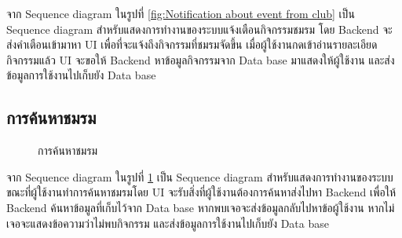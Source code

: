 \documentclass[14pt,oneside,openright,a4paper]{cpe-thai-project}
\begin{document}
  จาก Sequence diagram ในรูปที่ \ref{fig:Notification about event from club} เป็น Sequence diagram สำหรับแสดงการทำงานของระบบแจ้งเตือนกิจกรรมชมรม โดย Backend จะส่งคำเตือนเข้ามาหา UI เพื่อที่จะแจ้งถึงกิจกรรมที่ชมรมจัดขึ้น เมื่อผู้ใช้งานกดเข้าอ่านรายละเอียดกิจกรรมแล้ว UI จะขอให้ Backend หาข้อมูลกิจกรรมจาก Data base มาแสดงให้ผู้ใช้งาน และส่งข้อมูลการใช้งานไปเก็บยัง Data base

\newpage

\subsection{การค้นหาชมรม}

  \begin{figure}[!h]\centering
    \setlength{\fboxrule}{0.5mm} %
    \setlength{\fboxsep}{0.5cm}
    \caption{การค้นหาชมรม}\label{fig:Seacrh club}
  \end{figure}

  จาก Sequence diagram ในรูปที่ \ref{fig:Seacrh club} เป็น Sequence diagram สำหรับแสดงการทำงานของระบบขณะที่ผู้ใช้งานทำการค้นหาชมรมโดย UI จะรับสิ่งที่ผู้ใช้งานต้องการค้นหาส่งไปหา Backend เพื่อให้ Backend ค้นหาข้อมูลที่เก็บไว้จาก Data base หากพบเจอจะส่งข้อมูลกลับไปหาข้อผู้ใช้งาน หากไม่เจอจะแสดงข้อความว่าไม่พบกิจกรรม และส่งข้อมูลการใช้งานไปเก็บยัง Data base
\end{document}
